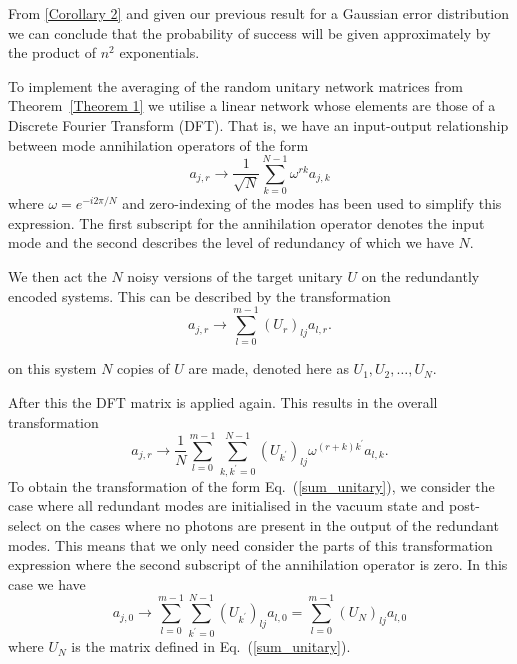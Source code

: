 \documentclass[aps,pra,twocolumn,superscriptaddress,numerical]{revtex4-1}
\begin{document}
From \ref{Corollary 2} and given our previous result for a Gaussian error distribution we can conclude that the probability of success will be given approximately by the product of $n^2$ exponentials.

To implement the averaging of the random unitary network matrices from Theorem~\ref{Theorem 1} we utilise a linear network whose elements are those of a Discrete Fourier Transform (DFT).  That is, we have an input-output relationship between mode annihilation operators of the form
\begin{equation}
	a_{j,r} \rightarrow \frac{1}{\sqrt{N}} \sum_{k=0}^{N-1} \omega^{rk} a_{j,k}	
\end{equation}
where $\omega = e^{-i2\pi /N}$ and zero-indexing of the modes has been used to simplify this expression.  The first subscript for the annihilation operator denotes the input mode and the second describes the level of redundancy of which we have $N$.

We then act the $N$ noisy versions of the target unitary $U$ on the redundantly encoded systems.  This can be described by the transformation
\begin{equation}
	a_{j,r} \rightarrow \sum_{l=0}^{m-1} (U_r)_{lj} a_{l,r}.
\end{equation}

on this system $N$ copies of $U$ are made, denoted here as $U_1, U_2, \ldots, U_N$. 

After this the DFT matrix is applied again.  This results in the overall transformation
\begin{equation}
	a_{j,r} \rightarrow \frac{1}{N} 
	\sum_{l=0}^{m-1} \sum_{k,k^\prime=0}^{N-1}
	(U_{k^\prime})_{lj} \omega^{(r+k)k^\prime} a_{l,k}.
\end{equation}
To obtain the transformation of the form Eq.~(\ref{sum_unitary}), we consider the case where all redundant modes are initialised in the vacuum state and post-select on the cases where no photons are present in the output of the redundant modes.  This means that we only need consider the parts of this transformation expression where the second subscript of the annihilation operator is zero.  In this case we have
\begin{equation}
	\label{sum_transformation}
	a_{j,0} \rightarrow \sum_{l=0}^{m-1} \sum_{k^\prime=0}^{N-1}
	(U_{k^\prime})_{lj} a_{l,0} = \sum_{l=0}^{m-1} (U_N)_{lj} a_{l,0}
\end{equation}
where $U_N$ is the matrix defined in Eq.~(\ref{sum_unitary}).
\end{document}
